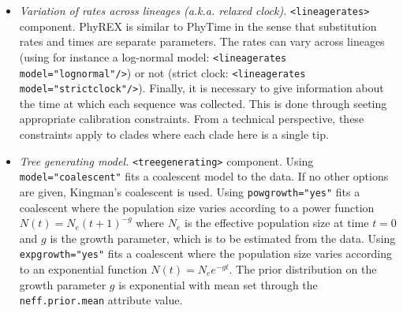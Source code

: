 \documentclass[a4paper,12pt]{article}
\newcommand{\x}[1]{\texttt{#1}}
\begin{document}
\begin{itemize}
can be estimated directly from the data and setting it to a particular value or using an informative
prior is not mandatory. 
\item {\em Variation of rates across lineages (a.k.a. relaxed clock).}
  \x{<lineagerates>} component.
  PhyREX is similar to PhyTime in the sense that substitution rates and times are separate parameters. 
The rates can vary across lineages (using for instance a log-normal model: \x{<lineagerates
  model="lognormal"/>}) or not (strict clock: \x{<lineagerates model="strictclock"/>}). Finally, it is necessary to give information about the time at which each
sequence was collected. This is done through seeting appropriate calibration constraints. From a
technical perspective, these constraints apply to clades where each clade here is a single tip.
\item {\em Tree generating model.} \x{<treegenerating>} component. Using \x{model="coalescent"}
    fits a coalescent model to the data. If no other options are given, Kingman's coalescent is
    used. Using \x{powgrowth="yes"} fits a coalescent where the population size varies according to
    a power function $N(t) = N_e(t+1)^{-g}$ where $N_e$ is the effective population size at time $t=0$
    and $g$ is the growth parameter, which is to be estimated from the data. Using
    \x{expgrowth="yes"} fits a coalescent where the population size varies according to an
    exponential function  $N(t) = N_ee^{-gt}$. The prior distribution on the growth parameter $g$ is
    exponential with mean set through the \x{neff.prior.mean} attribute value.
\end{itemize}
\end{document}
